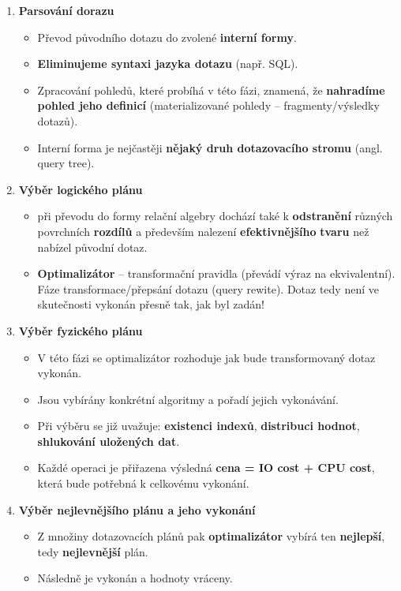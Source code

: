 \begin{enumerate}
  \item \textbf{Parsování dorazu}
        \begin{itemize}
          \item Převod původního dotazu do zvolené \textbf{interní formy}.
          \item \textbf{Eliminujeme syntaxi jazyka dotazu} (např. SQL).
          \item Zpracování pohledů, které probíhá v této fázi, znamená, že \textbf{nahradíme pohled jeho definicí} (materializované pohledy -- fragmenty/výsledky dotazů).
          \item Interní forma je nejčastěji \textbf{nějaký druh dotazovacího stromu} (angl. query tree).
        \end{itemize}
  \item \textbf{Výběr logického plánu}
        \begin{itemize}
          \item při převodu do formy relační algebry dochází také k \textbf{odstranění} různých povrchních \textbf{rozdílů} a především nalezení \textbf{efektivnějšího} \textbf{tvaru} než nabízel původní dotaz.
          \item \textbf{Optimalizátor} – transformační pravidla (převádí výraz na ekvivalentní). Fáze transformace/přepsání dotazu (query rewite). Dotaz tedy není ve skutečnosti vykonán přesně tak, jak byl zadán!
        \end{itemize}
  \item \textbf{Výběr fyzického plánu}
        \begin{itemize}
          \item V této fázi se optimalizátor rozhoduje jak bude transformovaný dotaz vykonán.
          \item Jsou vybírány konkrétní algoritmy a pořadí jejich vykonávání.
          \item Při výběru se již uvažuje: \textbf{existenci indexů}, \textbf{distribuci hodnot}, \textbf{shlukování uložených dat}.
          \item Každé operaci je přiřazena výsledná \textbf{cena = IO cost + CPU cost}, která bude potřebná k celkovému vykonání.
        \end{itemize}
  \item \textbf{Výběr nejlevnějšího plánu a jeho vykonání}
        \begin{itemize}
          \item Z množiny dotazovacích plánů pak \textbf{optimalizátor} vybírá ten \textbf{nejlepší}, tedy \textbf{nejlevnější} plán.
          \item Následně je vykonán a hodnoty vráceny.
        \end{itemize}
\end{enumerate}

